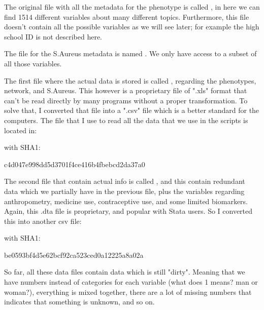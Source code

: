 The original file with all the metadata for the phenotype is called , in here we can find 1514 different variables about many different topics. Furthermore, this file doesn't contain all the possible variables as we will see later; for example the high school ID is not described here.\vspace{3 mm}

The file for the S.Aureus metadata is named . We only have access to a subset of all those variables.\vspace{3 mm}

The first file where the actual data is stored is called  , regarding the phenotypes, network, and S.Aureus. This however is a proprietary file of ".xls" format that can't be read directly by many programs without a proper transformation. To solve that, I converted that file into a ".csv" file which is a better standard for the computers. The file that I use to read all the data that we use in the scripts is located in: \vspace{3 mm}

 \vspace{3 mm}

with SHA1: \vspace{3 mm}

c4d047e998dd5d3701f4ce416b4fbebcd2da37a0 \vspace{3 mm}

The second file that contain actual info is called , and this contain redundant data which we partially have in the previous file, plus the variables regarding anthropometry, medicine use, contraceptive use, and some limited biomarkers. Again, this .dta file is proprietary, and popular with Stata users. So I converted this into another csv file:\vspace{3 mm}

 \vspace{3 mm}

with SHA1: \vspace{3 mm}

be0593bf4d5e62bcf92ca523ced0a12225a8a02a \vspace{3 mm}

So far, all these data files contain data which is still "dirty". Meaning that we have numbers instead of categories for each variable (what does 1 means? man or woman?), everything is mixed together, there are a lot of missing numbers that indicates that something is unknown, and so  on. \vspace{3 mm}

